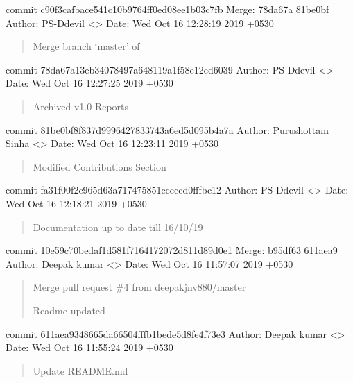 \documentclass[letterpaper,10pt,english]{sphinxmanual}
\begin{document}
commit c90f3cafbace541c10b9764ff0ed08ee1b03c7fb
Merge: 78da67a 81be0bf
Author: PS-Ddevil \textless{}\textgreater{}
Date:   Wed Oct 16 12:28:19 2019 +0530
\begin{quote}

Merge branch ‘master’ of 
\end{quote}

commit 78da67a13eb34078497a648119a1f58e12ed6039
Author: PS-Ddevil \textless{}\textgreater{}
Date:   Wed Oct 16 12:27:25 2019 +0530
\begin{quote}

Archived v1.0 Reports
\end{quote}

commit 81be0bf8f837d9996427833743a6ed5d095b4a7a
Author: Purushottam Sinha \textless{}\textgreater{}
Date:   Wed Oct 16 12:23:11 2019 +0530
\begin{quote}

Modified Contributions Section
\end{quote}

commit fa31f00f2c965d63a717475851ececcd0fffbc12
Author: PS-Ddevil \textless{}\textgreater{}
Date:   Wed Oct 16 12:18:21 2019 +0530
\begin{quote}

Documentation up to date till 16/10/19
\end{quote}

commit 10e59c70bedaf1d581f7164172072d811d89d0e1
Merge: b95df63 611aea9
Author: Deepak kumar \textless{}\textgreater{}
Date:   Wed Oct 16 11:57:07 2019 +0530
\begin{quote}

Merge pull request \#4 from deepakjnv880/master

Readme updated
\end{quote}

commit 611aea9348665da66504fffb1bede5d8fe4f73e3
Author: Deepak kumar \textless{}\textgreater{}
Date:   Wed Oct 16 11:55:24 2019 +0530
\begin{quote}

Update README.md
\end{quote}
\end{document}
